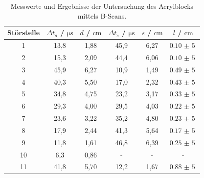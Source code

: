 \begin{table}
  \centering
  \caption{Messwerte und Ergebnisse der Untersuchung des Acrylblocks mittels B-Scans.}
  \label{tab4}
  \begin{tabular}{ c c c c c c }
    \toprule
    Störstelle & $\Delta t_d$ / $\si{\micro \second}$ & $d$ / $\si{\cm}$ & $\Delta t_s$ / $\si{\micro \second}$ & $s$ / $\si{\cm}$ & $l$ / $\si{\cm}$ \\
    \midrule
     1    &   13,8    &     1,88    &     45,9      &     6,27      &     $\SI{0,10(5)}{}$    \\
     2    &   15,3    &     2,09    &     44,4      &     6,06      &     $\SI{0,10(5)}{}$    \\
     3    &   45,9    &     6,27    &     10,9      &     1,49      &     $\SI{0,49(5)}{}$    \\
     4    &   40,3    &     5,50    &     17,0      &     2,32      &     $\SI{0,43(5)}{}$    \\
     5    &   34,8    &     4,75    &     23,2      &     3,17      &     $\SI{0,33(5)}{}$    \\
     6    &   29,3    &     4,00    &     29,5      &     4,03      &     $\SI{0,22(5)}{}$    \\
     7    &   23,6    &     3,22    &     35,2      &     4,80      &     $\SI{0,23(5)}{}$    \\
     8    &   17,9    &     2,44    &     41,3      &     5,64      &     $\SI{0,17(5)}{}$    \\
     9    &   11,8    &     1,61    &     46,8      &     6,39      &     $\SI{0,25(5)}{}$    \\
    10    &    6,3    &     0,86    &     -         &     -         &     -                   \\
    11    &   41,8    &     5,70    &     12,2      &     1,67      &     $\SI{0,88(5)}{}$    \\
    \bottomrule
    \end{tabular}
\end{table}
\FloatBarrier

